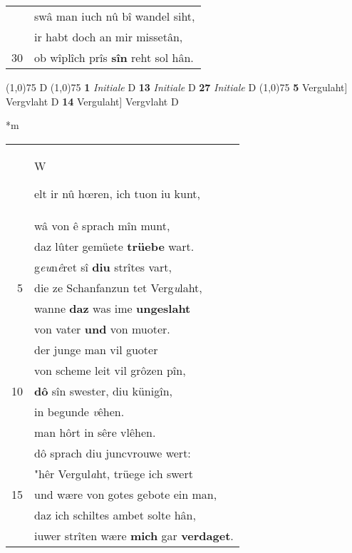 \documentclass[8pt,a4paper,notitlepage]{article}
\begin{document}
\begin{table}[ht]
\begin{minipage}[t]{0.5\linewidth}
\begin{tabular}{rl}
 & swâ man iuch nû bî wandel siht,\\ 
 & ir habt doch an mir missetân,\\ 
30 & ob wîplîch prîs \textbf{sîn} reht sol hân.\\ 
\end{tabular}
\scriptsize
\line(1,0){75} \newline
D \newline
\line(1,0){75} \newline
\textbf{1} \textit{Initiale} D  \textbf{13} \textit{Initiale} D  \textbf{27} \textit{Initiale} D  \newline
\line(1,0){75} \newline
\textbf{5} Vergulaht] Vergvlaht D \textbf{14} Vergulaht] Vergvlaht D \newline
\end{minipage}
\hspace{0.5cm}
\begin{minipage}[t]{0.5\linewidth}
\small
\begin{center}*m
\end{center}
\begin{tabular}{rl}
 & \begin{large}W\end{large}elt ir nû hœren, ich tuon iu kunt,\\ 
 & wâ von ê sprach mîn munt,\\ 
 & daz lûter gemüete \textbf{trüebe} wart.\\ 
 & g\textit{eu}n\textit{ê}ret sî \textbf{diu} strîtes vart,\\ 
5 & die ze Schanfanzun tet Verg\textit{u}laht,\\ 
 & wanne \textbf{daz} was ime \textbf{ungeslaht}\\ 
 & von vater \textbf{und} von muoter.\\ 
 & der junge man vil guoter\\ 
 & von scheme leit vil grôzen pîn,\\ 
10 & \textbf{dô} sîn swester, diu künigîn,\\ 
 & in begunde \textit{v}êhen.\\ 
 & man hôrt in sêre vlêhen.\\ 
 & dô sprach diu juncvrouwe wert:\\ 
 & "hêr Vergul\textit{a}ht, trüege ich swert\\ 
15 & und wære von gotes gebote ein man,\\ 
 & daz ich schiltes ambet solte hân,\\ 
 & iuwer strîten wære \textbf{mich} gar \textbf{verdaget}.\\ 

\end{tabular}
\end{minipage}
\end{table}
\end{document}
